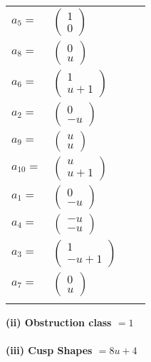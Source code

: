\documentclass[1p]{elsarticle_modified}
\theoremstyle{definition}
\begin{document}
\begin{tabular}{m{7pt} m{180pt} m{7pt} m{180pt} }
\flushright $a_{5}=$&$\begin{pmatrix}1\\0\end{pmatrix}$ \\
\flushright $a_{8}=$&$\begin{pmatrix}0\\u\end{pmatrix}$ \\
\flushright $a_{6}=$&$\begin{pmatrix}1\\u+1\end{pmatrix}$ \\
\flushright $a_{2}=$&$\begin{pmatrix}0\\- u\end{pmatrix}$ \\
\flushright $a_{9}=$&$\begin{pmatrix}u\\u\end{pmatrix}$ \\
\flushright $a_{10}=$&$\begin{pmatrix}u\\u+1\end{pmatrix}$ \\
\flushright $a_{1}=$&$\begin{pmatrix}0\\- u\end{pmatrix}$ \\
\flushright $a_{4}=$&$\begin{pmatrix}- u\\- u\end{pmatrix}$ \\
\flushright $a_{3}=$&$\begin{pmatrix}1\\- u+1\end{pmatrix}$ \\
\flushright $a_{7}=$&$\begin{pmatrix}0\\u\end{pmatrix}$\\&\end{tabular}
\flushleft \textbf{(ii) Obstruction class $= 1$}\\~\\
\flushleft \textbf{(iii) Cusp Shapes $= 8 u+4$}\\~\\
\end{document}

